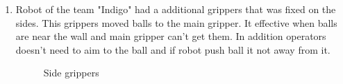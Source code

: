 \begin{enumerate}
\begin{enumerate}
		\item Robot of the team "Indigo" had a additional grippers that was fixed on the sides. This grippers moved balls to the main gripper. It effective when balls are near the wall and main gripper can't get them. In addition operators doesn't need to aim to the ball and if robot push ball it not away from it. 
		\begin{figure}[H]
			\begin{minipage}[h]{0.47\linewidth}
			\end{minipage}
			\hfill
			\begin{minipage}[h]{0.47\linewidth}
			\end{minipage}
			\caption{Side grippers}
		\end{figure}
		

\end{enumerate}
\end{enumerate}
